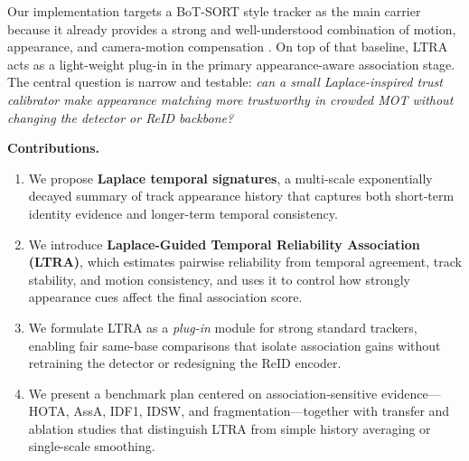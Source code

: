 Our implementation targets a BoT-SORT style tracker as the main carrier because it already provides a strong and well-understood combination of motion, appearance, and camera-motion compensation \cite{aharon2022botsort}. On top of that baseline, LTRA acts as a light-weight plug-in in the primary appearance-aware association stage. The central question is narrow and testable: \emph{can a small Laplace-inspired trust calibrator make appearance matching more trustworthy in crowded MOT without changing the detector or ReID backbone?}

\textbf{Contributions.}
\begin{enumerate}
  \item We propose \textbf{Laplace temporal signatures}, a multi-scale exponentially decayed summary of track appearance history that captures both short-term identity evidence and longer-term temporal consistency.
  \item We introduce \textbf{Laplace-Guided Temporal Reliability Association (LTRA)}, which estimates pairwise reliability from temporal agreement, track stability, and motion consistency, and uses it to control how strongly appearance cues affect the final association score.
  \item We formulate LTRA as a \emph{plug-in} module for strong standard trackers, enabling fair same-base comparisons that isolate association gains without retraining the detector or redesigning the ReID encoder.
  \item We present a benchmark plan centered on association-sensitive evidence---HOTA, AssA, IDF1, IDSW, and fragmentation---together with transfer and ablation studies that distinguish LTRA from simple history averaging or single-scale smoothing.
\end{enumerate}
